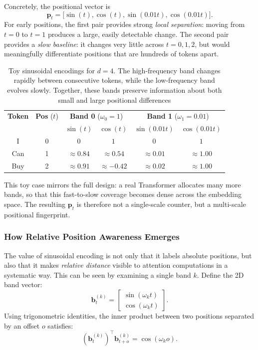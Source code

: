 \noindent
Concretely, the positional vector is
\[
\mathbf{p}_t =
\bigl[
\sin(t), \cos(t), \sin(0.01t), \cos(0.01t)
\bigr].
\]
For early positions, the first pair provides strong \emph{local separation}:
moving from \(t=0\) to \(t=1\) produces a large, easily detectable change.
The second pair provides a \emph{slow baseline}:
it changes very little across \(t=0,1,2\),
but would meaningfully differentiate positions that are hundreds of tokens apart.

\begin{table}[H]
	\centering
	\renewcommand{\arraystretch}{1.15}
	\begin{tabular}{|c|c|cc|cc|}
		\hline
		\textbf{Token} & \textbf{Pos} (\(t\)) &
		\multicolumn{2}{c|}{\textbf{Band 0} (\(\omega_0=1\))} &
		\multicolumn{2}{c|}{\textbf{Band 1} (\(\omega_1=0.01\))} \\
		& &
		\(\sin(t)\) & \(\cos(t)\) &
		\(\sin(0.01t)\) & \(\cos(0.01t)\) \\
		\hline
		I & 0 &
		\(0\) & \(1\) &
		\(0\) & \(1\) \\
		Can & 1 &
		\(\approx 0.84\) & \(\approx 0.54\) &
		\(\approx 0.01\) & \(\approx 1.00\) \\
		Buy & 2 &
		\(\approx 0.91\) & \(\approx -0.42\) &
		\(\approx 0.02\) & \(\approx 1.00\) \\
		\hline
	\end{tabular}
	\caption{Toy sinusoidal encodings for \(d=4\). The high-frequency band changes rapidly between consecutive tokens, while the low-frequency band evolves slowly. Together, these bands preserve information about both small and large positional differences}
	\label{tab:chapter17_pe_example_flowers}
\end{table}

\noindent
This toy case mirrors the full design:
a real Transformer allocates many more bands,
so that this fast-to-slow coverage becomes dense across the embedding space.
The resulting \(\mathbf{p}_t\) is therefore not a single-scale counter,
but a multi-scale positional fingerprint.

\subsubsection{How Relative Position Awareness Emerges}
\label{subsubsec:chapter17_relpos_sinusoids}
\noindent
The value of sinusoidal encoding is not only that it labels absolute positions,
but also that it makes \emph{relative distance} visible to attention computations in a systematic way.
This can be seen by examining a single band \(k\).
Define the 2D band vector:
\[
\mathbf{b}_t^{(k)} =
\begin{bmatrix}
	\sin(\omega_k t)\\
	\cos(\omega_k t)
\end{bmatrix}.
\]
Using trigonometric identities,
the inner product between two positions separated by an offset \(o\) satisfies:
\begin{equation}
	\label{eq:chapter17_band_inner_product}
	\left(\mathbf{b}_t^{(k)}\right)^\top \mathbf{b}_{t+o}^{(k)}
	=
	\cos(\omega_k o).
\end{equation}

